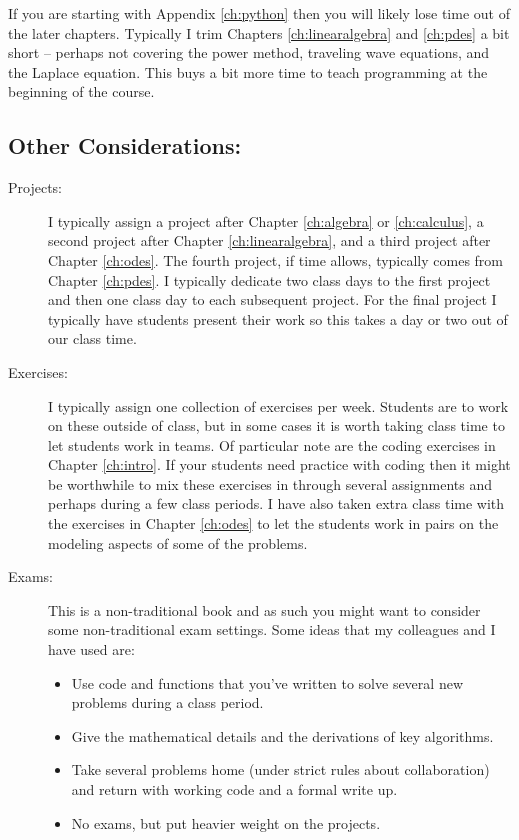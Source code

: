 \documentclass[
]{book}
\theoremstyle{definition}
\theoremstyle{definition}
\theoremstyle{definition}
\theoremstyle{remark}
\begin{document}
If you are starting with Appendix \ref{ch:python} then you will likely lose time out of the later chapters. Typically I trim Chapters \ref{ch:linearalgebra} and \ref{ch:pdes} a bit short -- perhaps not covering the power method, traveling wave equations, and the Laplace equation. This buys a bit more time to teach programming at the beginning of the course.

\hypertarget{other-considerations}{%
\subsection*{Other Considerations:}\label{other-considerations}}

\begin{description}
\item[Projects:]
I typically assign a project after Chapter \ref{ch:algebra} or \ref{ch:calculus}, a second project
after Chapter \ref{ch:linearalgebra}, and a third project after Chapter \ref{ch:odes}. The fourth
project, if time allows, typically comes from Chapter \ref{ch:pdes}. I typically
dedicate two class days to the first project and then one class day
to each subsequent project. For the final project I typically have
students present their work so this takes a day or two out of our
class time.
\item[Exercises:]
I typically assign one collection of exercises per week. Students
are to work on these outside of class, but in some cases it is worth
taking class time to let students work in teams. Of particular note
are the coding exercises in Chapter \ref{ch:intro}. If your students need practice with coding
then it might be worthwhile to mix these exercises in through
several assignments and perhaps during a few class periods. I have
also taken extra class time with the exercises in Chapter \ref{ch:odes} to
let the students work in pairs on the modeling aspects of some of
the problems.
\item[Exams:]
This is a non-traditional book and as such you might want to
consider some non-traditional exam settings. Some ideas that my
colleagues and I have used are:

\begin{itemize}
\item
  Use code and functions that you've written to solve several new
  problems during a class period.
\item
  Give the mathematical details and the derivations of key
  algorithms.
\item
  Take several problems home (under strict rules about
  collaboration) and return with working code and a formal write
  up.
\item
  No exams, but put heavier weight on the projects.
\end{itemize}
\end{description}
\end{document}
